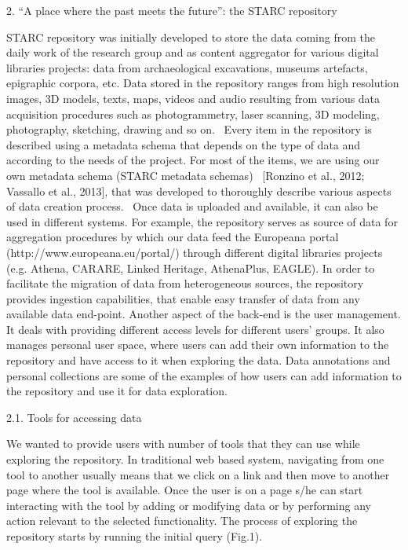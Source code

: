 \documentclass[amsthm,ebook]{saparticle}
\begin{document}
\bigskip

2. “A place where the past meets the future”: the STARC repository

STARC repository was initially developed to store the data coming from the daily work of the research group and as
content aggregator for various digital libraries projects: data from archaeological excavations, museums artefacts,
epigraphic corpora, etc. Data stored in the repository ranges from high resolution images, 3D models, texts, maps,
videos and audio resulting from various data acquisition procedures such as photogrammetry, laser scanning, 3D
modeling, photography, sketching, drawing and so on. \ Every item in the repository is described using a metadata
schema that depends on the type of data and according to the needs of the project. For most of the items, we are using
our own metadata schema (STARC metadata schemas) \ [Ronzino et al., 2012; Vassallo et al., 2013], that was developed to
thoroughly describe various aspects of data creation process. \ Once data is uploaded and available, it can also be
used in different systems. For example, the repository serves as source of data for aggregation procedures by which our
data feed the Europeana portal (http://www.europeana.eu/portal/) through different digital libraries projects (e.g.
Athena, CARARE, Linked Heritage, AthenaPlus, EAGLE). In order to facilitate the migration of data from heterogeneous
sources, the repository provides ingestion capabilities, that enable easy transfer of data from any available data
end-point. Another aspect of the back-end is the user management. It deals with providing different access levels for
different users’ groups. It also manages personal user space, where users can add their own information to the
repository and have access to it when exploring the data. Data annotations and personal collections are some of the
examples of how users can add information to the repository and use it for data exploration. 


\bigskip

2.1. Tools for accessing data 

We wanted to provide users with number of tools that they can use while exploring the repository. In traditional web
based system, navigating from one tool to another usually means that we click on a link and then move to another page
where the tool is available. Once the user is on a page s/he can start interacting with the tool by adding or modifying
data or by performing any action relevant to the selected functionality. The process of exploring the repository starts
by running the initial query (Fig.1). \ 
\end{document}
